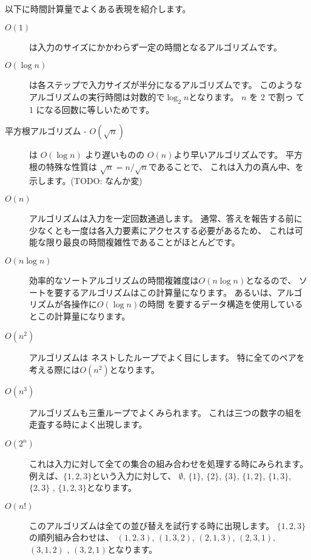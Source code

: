 
以下に時間計算量でよくある表現を紹介します。

\begin{description}
\item[$O(1)$]
 は入力のサイズにかかわらず一定の時間となるアルゴリズムです。

\item[$O(\log n)$]
 は各ステップで入力サイズが半分になるアルゴリズムです。
このようなアルゴリズムの実行時間は対数的で$\log_2 n$となります。
$n$ を $2$ で割っ て 1 になる回数に等しいためです。

\item[平方根アルゴリズム - $O(\sqrt n)$]
 は
$O(\log n)$ より遅いものの $O(n)$より早いアルゴリズムです。
平方根の特殊な性質は
$\sqrt n = n/\sqrt n$であることで、
これは入力の真ん中、を示します。(TODO: なんか変)

\item[$O(n)$]
アルゴリズムは入力を一定回数通過します。
通常、答えを報告する前に少なくとも一度は各入力要素にアクセスする必要があるため、
これは可能な限り最良の時間複雑性であることがほとんどです。

\item[$O(n \log n)$]
効率的なソートアルゴリズムの時間複雑度は$O(n \log n)$となるので、
ソートを要するアルゴリズムはこの計算量になります。
あるいは、アルゴリズムが各操作に$O( \log n)$の時間
を要するデータ構造を使用しているとこの計算量になります。

\item[$O(n^2)$]
 アルゴリズムは
ネストしたループでよく目にします。
特に全てのペアを考える際には$O(n^2)$となります。

\item[$O(n^3)$]
アルゴリズムも三重ループでよくみられます。
これは三つの数字の組を走査する時によく出現します。

\item[$O(2^n)$]
これは入力に対して全ての集合の組み合わせを処理する時にみられます。
例えば、$\{1,2,3\}$という入力に対して、
$\emptyset$, $\{1\}$, $\{2\}$, $\{3\}$, $\{1,2\}$,
$\{1,3\}$, $\{2,3\}$ , $\{1,2,3\}$となります。

\item[$O(n!)$]
このアルゴリズムは全ての並び替えを試行する時に出現します。
$\{1,2,3\}$ の順列組み合わせは、
$(1,2,3)$, $(1,3,2)$, $(2,1,3)$, $(2,3,1)$,
$(3,1,2)$ , $(3,2,1)$となります。

\end{description}

